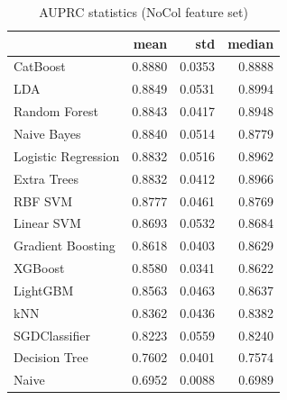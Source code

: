 \begin{table}
\caption{AUPRC statistics (NoCol feature set)}
\label{tab:auprc_NoCol_stats}
\begin{tabular}{lrrr}
\toprule
 & mean & std & median \\
\midrule
CatBoost & 0.8880 & 0.0353 & 0.8888 \\
LDA & 0.8849 & 0.0531 & 0.8994 \\
Random Forest & 0.8843 & 0.0417 & 0.8948 \\
Naive Bayes & 0.8840 & 0.0514 & 0.8779 \\
Logistic Regression & 0.8832 & 0.0516 & 0.8962 \\
Extra Trees & 0.8832 & 0.0412 & 0.8966 \\
RBF SVM & 0.8777 & 0.0461 & 0.8769 \\
Linear SVM & 0.8693 & 0.0532 & 0.8684 \\
Gradient Boosting & 0.8618 & 0.0403 & 0.8629 \\
XGBoost & 0.8580 & 0.0341 & 0.8622 \\
LightGBM & 0.8563 & 0.0463 & 0.8637 \\
kNN & 0.8362 & 0.0436 & 0.8382 \\
SGDClassifier & 0.8223 & 0.0559 & 0.8240 \\
Decision Tree & 0.7602 & 0.0401 & 0.7574 \\
Naive & 0.6952 & 0.0088 & 0.6989 \\
\bottomrule
\end{tabular}
\end{table}
